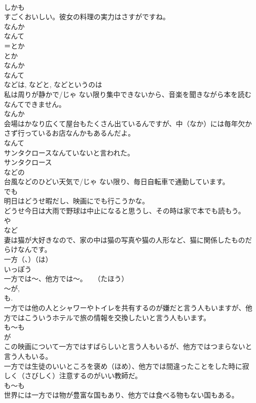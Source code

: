 \documentclass[8pt]{extreport}
\begin{document}
\begin{CJK}{UTF8}{min}
\\	しかも
\\	すごくおいしい。彼女の料理の実力はさすがですね。
\\	なんか
\\	なんて
\\	＝とか
\\	とか
\\	なんか 
\\	なんて 
\\	などは, などと, などというのは
\\	私は周りが静かで/じゃ ない限り集中できないから、音楽を聞きながら本を読むなんてできません。
\\	なんか
\\	会場はかなり広くて屋台もたくさん出ているんですが、中（なか）には毎年欠かさず行っているお店なんかもあるんだよ。
\\	なんて 
\\	サンタクロースなんていないと言われた。
\\	サンタクロース
\\	などの
\\	台風などのひどい天気で/じゃ ない限り、毎日自転車で通勤しています。
\\	でも 
\\	明日はどうせ暇だし、映画にでも行こうかな。
\\	どうせ今日は大雨で野球は中止になると思うし、その時は家で本でも読もう。
\\	や
\\	など　　
\\	妻は猫が大好きなので、家の中は猫の写真や猫の人形など、猫に関係したものだらけなんです。
\\	一方（、）（は）
\\	いっぽう
\\	一方では～、他方では～。　　（たほう）
\\	～が, 
\\	も. 
\\	一方では他の人とシャワーやトイレを共有するのが嫌だと言う人もいますが、他方ではこういうホテルで旅の情報を交換したいと言う人もいます。
\\	も～も 
\\	が 
\\	この映画について一方ではすばらしいと言う人もいるが、他方ではつまらないと言う人もいる。
\\	一方では生徒のいいところを褒め（ほめ）、他方では間違ったことをした時に寂しく（さびしく）注意するのがいい教師だ。
\\	も～も 
\\	世界には一方では物が豊富な国もあり、他方では食べる物もない国もある。

\end{CJK}
\end{document}
